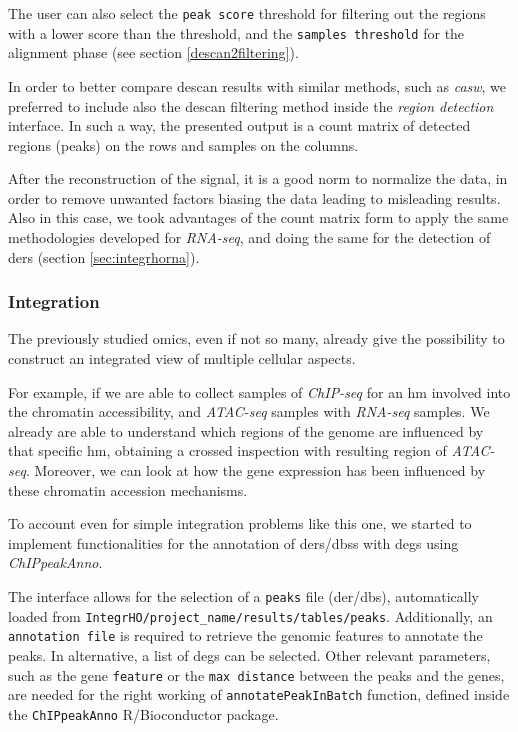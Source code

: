 The user can also select the \lstinline!peak score! threshold for filtering out the regions with a lower score than the threshold, and the \lstinline!samples threshold! for the alignment phase (see section \ref{descan2filtering}).

In order to better compare \gls{descan} results with similar methods, such as \textit{casw}, we preferred to include also the \gls{descan} filtering method inside the \textit{region detection} interface.
In such a way, the presented output is a count matrix of detected regions (peaks) on the rows and samples on the columns.

After the reconstruction of the signal, it is a good norm to normalize the data, in order to remove unwanted factors biasing the data leading to misleading results.
Also in this case, we took advantages of the count matrix form to apply the same methodologies developed for \textit{RNA-seq}, and doing the same for the detection of \glspl{der} (section \ref{sec:integrhorna}).

\subsubsection{Integration}
The previously studied omics, even if not so many, already give the possibility to construct an integrated view of multiple cellular aspects.

For example, if we are able to collect samples of \textit{ChIP-seq} for an \gls{hm} involved into the chromatin accessibility, and \textit{ATAC-seq} samples with \textit{RNA-seq} samples.
We already are able to understand which regions of the genome are influenced by that  specific \gls{hm}, obtaining a crossed inspection with resulting region of \textit{ATAC-seq}.
Moreover, we can look at how the gene expression has been influenced by these chromatin accession mechanisms.

To account even for simple integration problems like this one, we started to implement functionalities for the annotation of \glspl{der}/\glspl{dbs} with \glspl{deg} using \textit{ChIPpeakAnno}.



The interface allows for the selection of a \lstinline!peaks! file (\gls{der}/\gls{dbs}), automatically loaded from  \lstinline!IntegrHO/project_name/results/tables/peaks!.
Additionally, an \lstinline!annotation file! is required to retrieve the genomic features to annotate the peaks.
In alternative, a list of \glspl{deg} can be selected.
Other relevant parameters, such as the gene \lstinline!feature!  or the \lstinline!max distance! between the peaks and the genes, are needed for the right working of \lstinline!annotatePeakInBatch! function, defined inside the \lstinline!ChIPpeakAnno! R/Bioconductor package.



